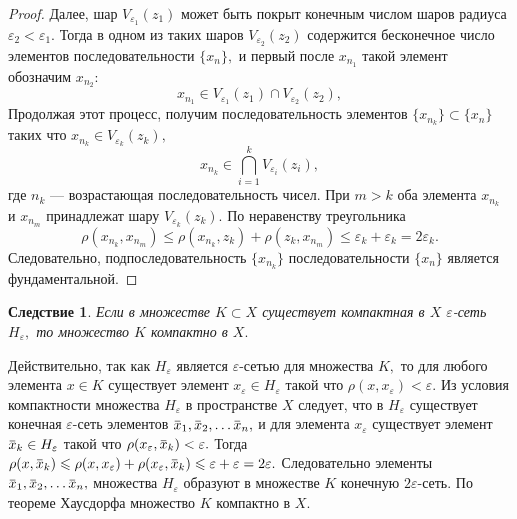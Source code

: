 \documentclass[12pt,a4paper,titlepage,oneside]{book}
\newcommand{\overbar}[1]{\mkern 1.5mu\overline{\mkern-1.5mu#1\mkern-1.5mu}\mkern 1.5mu}
\theoremstyle{definition}
\theoremstyle{plain}
\theoremstyle{break}
\theoremstyle{remark}
\theoremstyle{remark}
\theoremstyle{remark}
\theoremstyle{remark}
\theoremstyle{plain}
\theoremstyle{plain}
\newtheorem*{corollary}{Следствие}
\begin{document}
\begin{proof}
Далее, шар $ V_{\varepsilon _1} (z_1) $ может быть покрыт конечным числом шаров радиуса $\varepsilon _2 < \varepsilon _1.$ Тогда в одном из таких шаров $V_{\varepsilon _2} (z_2)$ содержится бесконечное число элементов последовательности $\{x_n\},$ и первый после $x_{n_1}$ такой элемент обозначим $x_{n_2}:$
\begin{equation*}
x_{n_1} \in V_{\varepsilon _1} (z_1) \cap V_{\varepsilon _2} (z_2),
\end{equation*}
Продолжая этот процесс, получим последовательность элементов $\{x_{n_k}\} \subset \{x_n\}$ таких что $x_{n_k} \in V_{\varepsilon _k} (z_k),$
\begin{equation*}
x_{n_k} \in \bigcap\limits_{i=1}^{k} V_{\varepsilon _i} (z_i),
\end{equation*}
где $n_k$ --- возрастающая последовательность чисел. При $m > k$ оба элемента $x_{n_k}$ и $x_{n_m}$ принадлежат шару $V_{\varepsilon _k} (z_k).$ По неравенству треугольника 
\begin{equation*}
\rho(x_{n_k}, x_{n_m}) \leqslant \rho(x_{n_k}, z_k) + \rho(z_k, x_{n_m}) \leqslant \varepsilon_k + \varepsilon_k = 2 \varepsilon _k.
\end{equation*}
Следовательно, подпоследовательность $\{x_{n_k}\}$ последовательности $\{x_n\}$ является фундаментальной.
\end{proof}

\begin{corollary}
Если в множестве $K \subset X$ существует компактная в $X$ $\varepsilon$-сеть $H_{\varepsilon},$ то множество $K$ компактно в $X.$ 
\end{corollary}

Действительно, так как $H_{\varepsilon} $ является $\varepsilon$-сетью для множества $K,$ то для любого элемента $x \in K$ существует элемент $x_{\varepsilon} \in H_{\varepsilon}$ такой что $\rho(x, x_{\varepsilon}) < \varepsilon.$ Из условия компактности множества $H_{\varepsilon}$ в пространстве $X$ следует, что в  $H_{\varepsilon}$ существует конечная $\varepsilon$-сеть элементов $\overbar{x}_1, \overbar{x}_2,\ldots \overbar{x}_n,$ и для элемента $x_{\varepsilon}$ существует элемент $\overbar{x}_k \in H_{\varepsilon}$ такой что $\rho(x_{\varepsilon}, \overbar{x}_k) < \varepsilon.$ Тогда $\rho(x, \overbar{x}_k) \leqslant \rho(x, x_{\varepsilon}) + \rho(x_{\varepsilon}, \overbar{x}_k) \leqslant \varepsilon + \varepsilon = 2 \varepsilon.$
Следовательно элементы $\overbar{x}_1, \overbar{x}_2,\ldots \overbar{x}_n,$ множества $H_{\varepsilon}$ образуют в множестве $K$ конечную $2 \varepsilon$-сеть. По теореме Хаусдорфа множество $K$ компактно в $X.$
\end{document}
